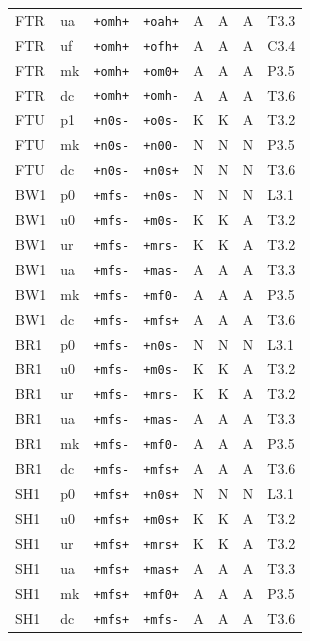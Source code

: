 {\begin{longtable}{@{}llllcccl@{}}
FTR & ua & \texttt{+omh+} & \texttt{+oah+} & A & A & A & T3.3 \\
FTR & uf & \texttt{+omh+} & \texttt{+ofh+} & A & A & A & C3.4 \\
FTR & mk & \texttt{+omh+} & \texttt{+om0+} & A & A & A & P3.5 \\
FTR & dc & \texttt{+omh+} & \texttt{+omh-} & A & A & A & T3.6 \\
FTU & p1 & \texttt{+n0s-} & \texttt{+o0s-} & K & K & A & T3.2 \\
FTU & mk & \texttt{+n0s-} & \texttt{+n00-} & N & N & N & P3.5 \\
FTU & dc & \texttt{+n0s-} & \texttt{+n0s+} & N & N & N & T3.6 \\
BW1 & p0 & \texttt{+mfs-} & \texttt{+n0s-} & N & N & N & L3.1 \\
BW1 & u0 & \texttt{+mfs-} & \texttt{+m0s-} & K & K & A & T3.2 \\
BW1 & ur & \texttt{+mfs-} & \texttt{+mrs-} & K & K & A & T3.2 \\
BW1 & ua & \texttt{+mfs-} & \texttt{+mas-} & A & A & A & T3.3 \\
BW1 & mk & \texttt{+mfs-} & \texttt{+mf0-} & A & A & A & P3.5 \\
BW1 & dc & \texttt{+mfs-} & \texttt{+mfs+} & A & A & A & T3.6 \\
BR1 & p0 & \texttt{+mfs-} & \texttt{+n0s-} & N & N & N & L3.1 \\
BR1 & u0 & \texttt{+mfs-} & \texttt{+m0s-} & K & K & A & T3.2 \\
BR1 & ur & \texttt{+mfs-} & \texttt{+mrs-} & K & K & A & T3.2 \\
BR1 & ua & \texttt{+mfs-} & \texttt{+mas-} & A & A & A & T3.3 \\
BR1 & mk & \texttt{+mfs-} & \texttt{+mf0-} & A & A & A & P3.5 \\
BR1 & dc & \texttt{+mfs-} & \texttt{+mfs+} & A & A & A & T3.6 \\
SH1 & p0 & \texttt{+mfs+} & \texttt{+n0s+} & N & N & N & L3.1 \\
SH1 & u0 & \texttt{+mfs+} & \texttt{+m0s+} & K & K & A & T3.2 \\
SH1 & ur & \texttt{+mfs+} & \texttt{+mrs+} & K & K & A & T3.2 \\
SH1 & ua & \texttt{+mfs+} & \texttt{+mas+} & A & A & A & T3.3 \\
SH1 & mk & \texttt{+mfs+} & \texttt{+mf0+} & A & A & A & P3.5 \\
SH1 & dc & \texttt{+mfs+} & \texttt{+mfs-} & A & A & A & T3.6 \\

\end{longtable}}
